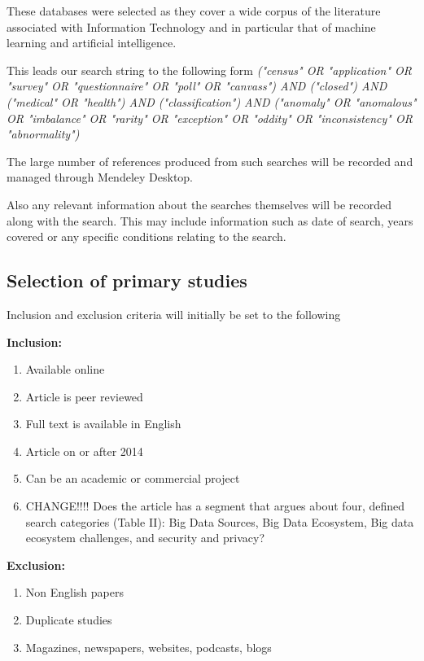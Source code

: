 These databases were selected as they cover a wide corpus of the literature associated with Information Technology and in particular that of machine learning and artificial intelligence. 



This leads our search string to the following form \textit{("census" OR "application" OR "survey" OR "questionnaire" OR "poll" OR "canvass") AND
("closed") AND
("medical" OR "health") AND
("classification") AND
("anomaly" OR "anomalous" OR "imbalance" OR "rarity" OR "exception" OR "oddity" OR "inconsistency" OR "abnormality")}

The large number of references produced from such searches will be recorded and managed through Mendeley Desktop.  
 
Also any relevant information about the searches themselves will be recorded along with the search. This may include information such as date of search, years covered or any specific conditions relating to the search. 
 
\subsection{Selection of primary studies}
 
\noindent
Inclusion and exclusion criteria will initially be set to the following 

\noindent
\textbf{Inclusion:}
\begin{enumerate}
  \item Available online
  \item Article is peer reviewed
  \item Full text is available in English
  \item Article on or after 2014
  \item Can be an academic or commercial project
  \item CHANGE!!!! Does the article has a segment that argues about four, defined search categories (Table II): Big Data Sources, Big Data Ecosystem, Big data ecosystem challenges, and security and privacy?
\end{enumerate}

\noindent
\textbf{Exclusion:}
\begin{enumerate}
  \item Non English papers
  \item Duplicate studies
  \item Magazines, newspapers, websites, podcasts, blogs
\end{enumerate}

